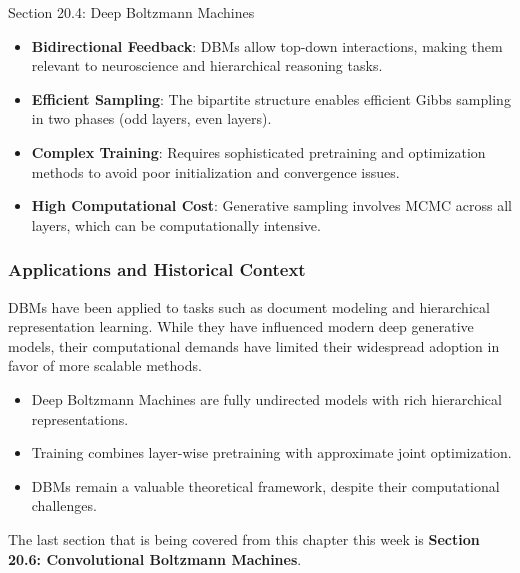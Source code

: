 \begin{notes}{Section 20.4: Deep Boltzmann Machines}
    \begin{highlight}
        \begin{itemize}
            \item \textbf{Bidirectional Feedback}: DBMs allow top-down interactions, making them relevant to neuroscience and hierarchical reasoning tasks.
            \item \textbf{Efficient Sampling}: The bipartite structure enables efficient Gibbs sampling in two phases (odd layers, even layers).
            \item \textbf{Complex Training}: Requires sophisticated pretraining and optimization methods to avoid poor initialization and convergence issues.
            \item \textbf{High Computational Cost}: Generative sampling involves MCMC across all layers, which can be computationally intensive.
        \end{itemize}
    \end{highlight}
    
    \subsubsection*{Applications and Historical Context}
    
    DBMs have been applied to tasks such as document modeling and hierarchical representation learning. While they have influenced modern deep generative models, their computational demands have limited their widespread adoption in favor of more scalable methods.
    
    \begin{highlight}
        \begin{itemize}
            \item Deep Boltzmann Machines are fully undirected models with rich hierarchical representations.
            \item Training combines layer-wise pretraining with approximate joint optimization.
            \item DBMs remain a valuable theoretical framework, despite their computational challenges.
        \end{itemize}
    \end{highlight}
\end{notes}

The last section that is being covered from this chapter this week is \textbf{Section 20.6: Convolutional Boltzmann Machines}.

